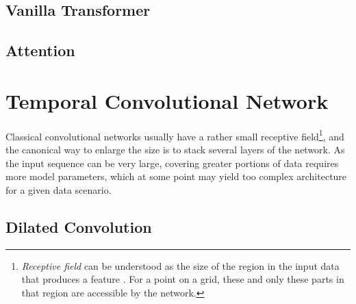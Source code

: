 \subsection{Vanilla Transformer}

\missing



\subsection{Attention}

\missing



\section{Temporal Convolutional Network}

Classical convolutional networks usually have a rather small receptive field\footnote{\emph{Receptive field} can be understood as the size of the region in the input data that produces a feature \cite{Araujo2019}. For a point on a grid, these and only these parts in that region are accessible by the network.}, and the canonical way to enlarge the size is to stack several layers of the network. As the input sequence can be very large, covering greater portions of data requires more model parameters, which at some point may yield too complex architecture for a given data scenario.

\subsection{Dilated Convolution}

